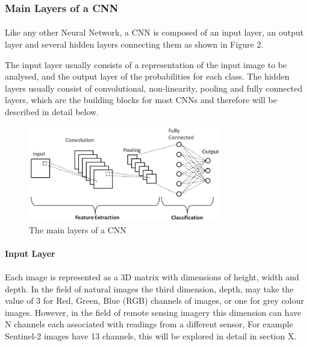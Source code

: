\documentclass{article}
\begin{document}
\subsubsection{Main Layers of a CNN}
\paragraph{}
Like any other Neural Network, a CNN is composed of an input layer, an output layer and several hidden layers connecting them as shown in Figure 2.

The input layer usually consists of a representation of the input image to be analysed, and the output layer of the probabilities for each class.
The hidden layers usually consist of convolutional, non-linearity, pooling and fully connected layers, which are the building blocks for most CNNs and therefore will be described in detail below.

    \begin{figure}[hbt!]
        \centering
        \includegraphics[width=0.75\textwidth]{cnnclassification.png}
        \caption{The main layers of a CNN \cite{10.6109/JICCE.2018.16.3.173}}
    \end{figure}

\paragraph{Input Layer}
\paragraph{}
Each image is represented as a 3D matrix with dimensions of height, width and depth. In the field of natural images the third dimension, depth, may take the value of 3 for Red, Green, Blue (RGB) channels of images, or one for grey colour images. However, in the field of remote sensing imagery this dimension can have N channels each associated with readings from a different sensor, For example Sentinel-2 images have 13 channels, this will be explored in detail in section X. 
\end{document}

